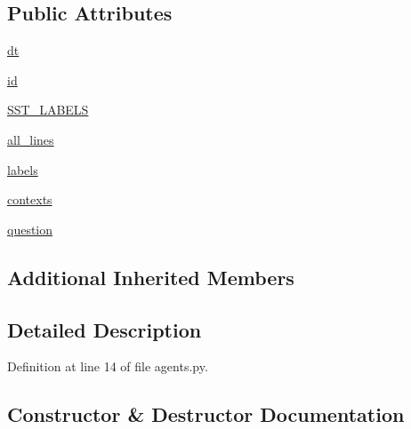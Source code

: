 \subsection*{Public Attributes}
\begin{DoxyCompactItemize}
\item 
\hyperlink{classparlai_1_1tasks_1_1sst_1_1agents_1_1SSTTeacher_a6569a040ff7272f78becaf53b50758df}{dt}
\item 
\hyperlink{classparlai_1_1tasks_1_1sst_1_1agents_1_1SSTTeacher_a620fc9e36feee1916bec41e01449421b}{id}
\item 
\hyperlink{classparlai_1_1tasks_1_1sst_1_1agents_1_1SSTTeacher_aae023784a28998142cbaac66d9ebb1ff}{S\+S\+T\+\_\+\+L\+A\+B\+E\+LS}
\item 
\hyperlink{classparlai_1_1tasks_1_1sst_1_1agents_1_1SSTTeacher_a555e131fc76d2c8b1ac08171f677e969}{all\+\_\+lines}
\item 
\hyperlink{classparlai_1_1tasks_1_1sst_1_1agents_1_1SSTTeacher_ab9c4dcb4b8b2b2e753dc53400bd4fdd9}{labels}
\item 
\hyperlink{classparlai_1_1tasks_1_1sst_1_1agents_1_1SSTTeacher_aec692483a930bc8463105457142ef84b}{contexts}
\item 
\hyperlink{classparlai_1_1tasks_1_1sst_1_1agents_1_1SSTTeacher_a8c33e7285f005f10ada92d3207d61399}{question}
\end{DoxyCompactItemize}
\subsection*{Additional Inherited Members}


\subsection{Detailed Description}


Definition at line 14 of file agents.\+py.



\subsection{Constructor \& Destructor Documentation}
\mbox{\label{classparlai_1_1tasks_1_1sst_1_1agents_1_1SSTTeacher_ad16c8f7acfe2dde86cc77eb9047c465f}} 
